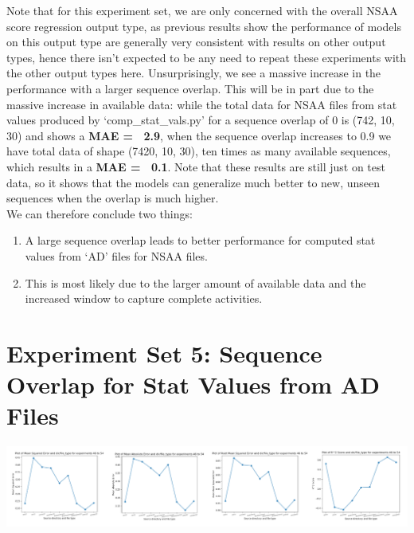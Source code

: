 \documentclass[12pt,twoside]{report}
\begin{document}
\quad Note that for this experiment set, we are only concerned with the overall NSAA score regression output type, as previous results show the performance of models on this output type are generally very consistent with results on other output types, hence there isn’t expected to be any need to repeat these experiments with the other output types here. Unsurprisingly, we see a massive increase in the performance with a larger sequence overlap. This will be in part due to the massive increase in available data: while the total data for NSAA files from stat values produced by ‘comp\_stat\_vals.py’ for a sequence overlap of 0 is (742, 10, 30) and shows a \textbf{MAE = ~2.9}, when the sequence overlap increases to 0.9 we have total data of shape (7420, 10, 30), ten times as many available sequences, which results in a \textbf{MAE = ~0.1}. Note that these results are still just on test data, so it shows that the models can generalize much better to new, unseen sequences when the overlap is much higher.\\

\quad We can therefore conclude two things:

\begin{enumerate}
	\item A large sequence overlap leads to better performance for computed stat values from ‘AD’ files for NSAA files.
	\item This is most likely due to the larger amount of available data and the increased window to capture complete activities.
\end{enumerate}




\section{Experiment Set 5: Sequence Overlap for Stat Values from AD Files}

\begin{center}
\includegraphics[scale=0.4]{project_figures/fig10_12}
\end{center}
\end{document}
